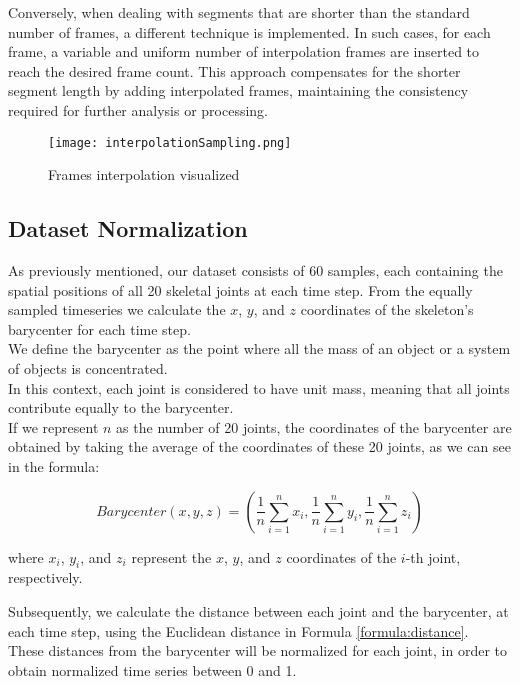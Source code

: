 Conversely, when dealing with segments that are shorter than the standard number of frames, a different technique is implemented.
In such cases, for each frame, a variable and uniform number of interpolation frames are inserted to reach the desired frame count. 
This approach compensates for the shorter segment length by adding interpolated frames, maintaining the consistency required for further analysis or processing.
\begin{figure}[H]
    \centering
    \texttt{[image: interpolationSampling.png]}
    \caption{Frames interpolation visualized}
    \label{fig:interp_sampling}
\end{figure}

\subsection{Dataset Normalization}
As previously mentioned, our dataset consists of 60 samples, each containing the spatial positions of all 20 skeletal joints at each time step.
From the equally sampled timeseries we calculate the $x$, $y$, and $z$ coordinates of the skeleton's barycenter for each time step. \\
We define the barycenter as the point where all the mass of an object or a system of objects is concentrated. \\
In this context, each joint is considered to have unit mass, meaning that all joints contribute equally to the barycenter. \\
If we represent $n$ as the number of 20 joints, the coordinates of the barycenter are obtained by taking the average of the coordinates of these 20 joints, as we can see in the formula:

\begin{equation}
    Barycenter (x, y, z) = \left(\frac{1}{n} \sum_{i=1}^{n} x_i, \frac{1}{n} \sum_{i=1}^{n} y_i, \frac{1}{n} \sum_{i=1}^{n} z_i\right)
    \label{formula:baricentro}
\end{equation}
    
where $x_i$, $y_i$, and $z_i$ represent the $x$, $y$, and $z$ coordinates of the $i$-th joint, respectively.

Subsequently, we calculate the distance between each joint and the barycenter, at each time step, using the Euclidean distance in Formula \ref{formula:distance}. \\
These distances from the barycenter will be normalized for each joint, in order to obtain normalized time series between 0 and 1.

